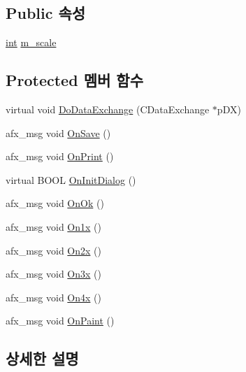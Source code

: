 \subsection*{Public 속성}
\begin{DoxyCompactItemize}
\item 
\mbox{\hyperlink{_util_8cpp_a0ef32aa8672df19503a49fab2d0c8071}{int}} \mbox{\hyperlink{class_g_b_printer_dlg_a0d0e4757bd074a2ab18268b938f76f85}{m\+\_\+scale}}
\end{DoxyCompactItemize}
\subsection*{Protected 멤버 함수}
\begin{DoxyCompactItemize}
\item 
virtual void \mbox{\hyperlink{class_g_b_printer_dlg_a686ce094a0100066f2a6446c908af150}{Do\+Data\+Exchange}} (C\+Data\+Exchange $\ast$p\+DX)
\item 
afx\+\_\+msg void \mbox{\hyperlink{class_g_b_printer_dlg_a3cfa1c22a60df868b53c9e9d52094963}{On\+Save}} ()
\item 
afx\+\_\+msg void \mbox{\hyperlink{class_g_b_printer_dlg_ac778254287374af1e218e778bdde4f26}{On\+Print}} ()
\item 
virtual B\+O\+OL \mbox{\hyperlink{class_g_b_printer_dlg_a0e1d0d5e238e3133e088bd1be4711755}{On\+Init\+Dialog}} ()
\item 
afx\+\_\+msg void \mbox{\hyperlink{class_g_b_printer_dlg_aa66f44a9ecd963327cf019c25ad3c54d}{On\+Ok}} ()
\item 
afx\+\_\+msg void \mbox{\hyperlink{class_g_b_printer_dlg_a56ab3fb0b4285c737a7ea796771a01a4}{On1x}} ()
\item 
afx\+\_\+msg void \mbox{\hyperlink{class_g_b_printer_dlg_a9b887ad630794874e2b39c3558bf5d33}{On2x}} ()
\item 
afx\+\_\+msg void \mbox{\hyperlink{class_g_b_printer_dlg_ac3863f81d31a5d37a0369dab6bfbf87e}{On3x}} ()
\item 
afx\+\_\+msg void \mbox{\hyperlink{class_g_b_printer_dlg_a36d0db8d85c1c2b70c3b9aa8b35c0026}{On4x}} ()
\item 
afx\+\_\+msg void \mbox{\hyperlink{class_g_b_printer_dlg_a07a9791b8dc7695afcaa02abada894db}{On\+Paint}} ()
\end{DoxyCompactItemize}


\subsection{상세한 설명}


